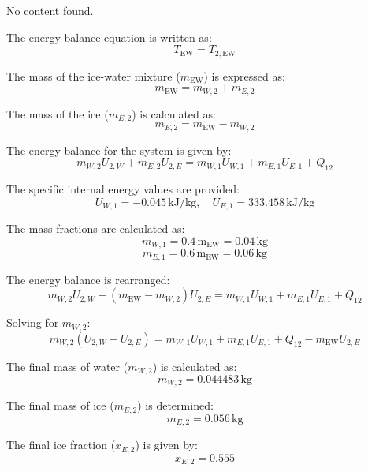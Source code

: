 No content found.

The energy balance equation is written as:  
\[
T_{\text{EW}} = T_{2,\text{EW}}
\]  

The mass of the ice-water mixture (\(m_{\text{EW}}\)) is expressed as:  
\[
m_{\text{EW}} = m_{W,2} + m_{E,2}
\]  

The mass of the ice (\(m_{E,2}\)) is calculated as:  
\[
m_{E,2} = m_{\text{EW}} - m_{W,2}
\]  

The energy balance for the system is given by:  
\[
m_{W,2} U_{2,W} + m_{E,2} U_{2,E} = m_{W,1} U_{W,1} + m_{E,1} U_{E,1} + Q_{12}
\]  

The specific internal energy values are provided:  
\[
U_{W,1} = -0.045 \, \text{kJ/kg}, \quad U_{E,1} = 333.458 \, \text{kJ/kg}
\]  

The mass fractions are calculated as:  
\[
m_{W,1} = 0.4 \, \text{m}_{\text{EW}} = 0.04 \, \text{kg}
\]  
\[
m_{E,1} = 0.6 \, \text{m}_{\text{EW}} = 0.06 \, \text{kg}
\]  

The energy balance is rearranged:  
\[
m_{W,2} U_{2,W} + (m_{\text{EW}} - m_{W,2}) U_{2,E} = m_{W,1} U_{W,1} + m_{E,1} U_{E,1} + Q_{12}
\]  

Solving for \(m_{W,2}\):  
\[
m_{W,2} (U_{2,W} - U_{2,E}) = m_{W,1} U_{W,1} + m_{E,1} U_{E,1} + Q_{12} - m_{\text{EW}} U_{2,E}
\]  

The final mass of water (\(m_{W,2}\)) is calculated as:  
\[
m_{W,2} = 0.044483 \, \text{kg}
\]  

The final mass of ice (\(m_{E,2}\)) is determined:  
\[
m_{E,2} = 0.056 \, \text{kg}
\]  

The final ice fraction (\(x_{E,2}\)) is given by:  
\[
x_{E,2} = 0.555
\]